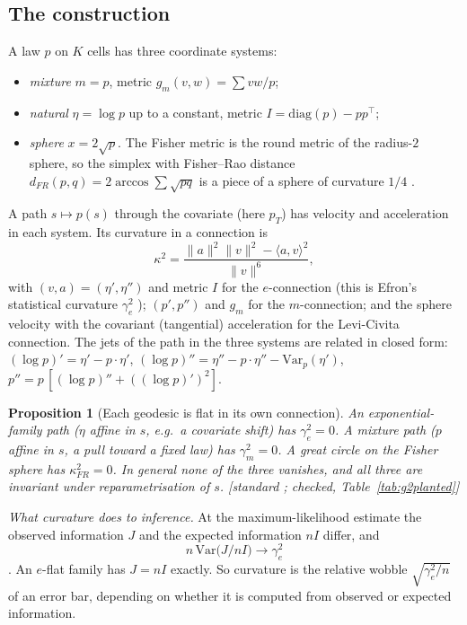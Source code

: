 \documentclass[11pt]{article}
\newtheorem{proposition}[theorem]{Proposition}
\theoremstyle{definition}
\theoremstyle{remark}
\begin{document}
\subsection{The construction}
A law $p$ on $K$ cells has three coordinate systems:
\begin{itemize}
  \item \emph{mixture} $m=p$, metric $g_m(v,w)=\sum v w/p$;
  \item \emph{natural} $\eta=\log p$ up to a constant, metric $I=\mathrm{diag}(p)-pp^\top$;
  \item \emph{sphere} $x=2\sqrt p$. The Fisher metric is the round metric of the radius-$2$ sphere, so the simplex with Fisher--Rao distance $d_{FR}(p,q)=2\arccos\sum\sqrt{pq}$ is a piece of a sphere of curvature $1/4$ \cite{amarinagaoka}.
\end{itemize}
A path $s\mapsto p(s)$ through the covariate (here $p_T$) has velocity and acceleration in each system. Its curvature in a connection is
\[ \kappa^2=\frac{\|a\|^2\|v\|^2-\langle a,v\rangle^2}{\|v\|^6}, \]
with $(v,a)=(\eta',\eta'')$ and metric $I$ for the $e$-connection (this is Efron's statistical curvature $\gamma_e^2$ \cite{efron75}); $(p',p'')$ and $g_m$ for the $m$-connection; and the sphere velocity with the covariant (tangential) acceleration for the Levi-Civita connection. The jets of the path in the three systems are related in closed form: $(\log p)'=\eta'-p\cdot\eta'$, $(\log p)''=\eta''-p\cdot\eta''-\mathrm{Var}_p(\eta')$, $p''=p\,[(\log p)''+((\log p)')^2]$.

\begin{proposition}[Each geodesic is flat in its own connection]\label{prop:dualflat}
An exponential-family path ($\eta$ affine in $s$, e.g.\ a covariate shift) has $\gamma_e^2=0$. A mixture path ($p$ affine in $s$, a pull toward a fixed law) has $\gamma_m^2=0$. A great circle on the Fisher sphere has $\kappa^2_{FR}=0$. In general none of the three vanishes, and all three are invariant under reparametrisation of $s$. \textup{[standard \cite{amarinagaoka}; checked, Table~\ref{tab:g2planted}]}
\end{proposition}

\emph{What curvature does to inference.} At the maximum-likelihood estimate the observed information $J$ and the expected information $nI$ differ, and
\[ n\,\mathrm{Var}\bigl(J/nI\bigr)\to\gamma_e^2 \]
\cite{efronhinkley78}. An $e$-flat family has $J=nI$ exactly. So curvature is the relative wobble $\sqrt{\gamma_e^2/n}$ of an error bar, depending on whether it is computed from observed or expected information.
\end{document}

